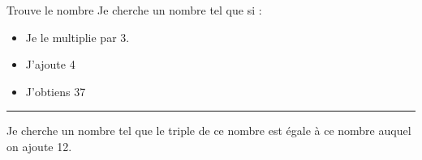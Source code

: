 \begin{frame}{Trouve le nombre}
    Je cherche un nombre tel que si : 
    \begin{itemize}
        \item Je le multiplie par 3.
        \item J'ajoute 4
        \item J'obtiens 37
    \end{itemize}
    \vspace*{0.5cm}
    \hrule
        Je cherche un nombre tel que le triple de ce nombre est égale à ce nombre auquel on ajoute 12.
\end{frame}